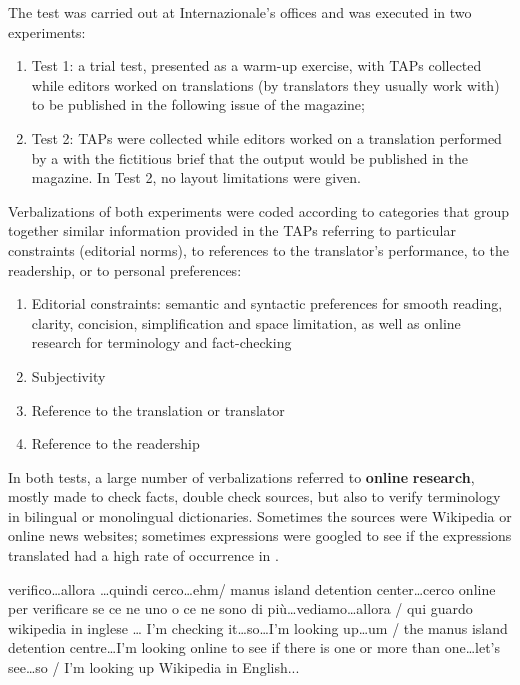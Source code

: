 \documentclass[output=paper]{LSP/langsci}
\begin{document}
The test was carried out at Internazionale's offices and was executed in two experiments: 


\begin{enumerate}
 \renewcommand{\labelenumi}{}
 \item Test 1: a trial test, presented as a warm-up exercise, with TAPs collected while editors worked on translations (by translators they usually work with) to be published in the following issue of the magazine;
 \item Test 2: TAPs were collected while editors worked on a translation performed by a  with the fictitious brief that the output would be published in the magazine. In Test 2, no layout limitations were given. 
\end{enumerate}

Verbalizations of both experiments were coded according to categories that group together similar information provided in the TAPs referring to particular constraints (editorial norms), to references to the translator's performance, to the readership, or to personal preferences: 

\begin{enumerate}
\renewcommand{\labelenumi}{\roman{enumi}.}%
 \item Editorial constraints: semantic and syntactic preferences for smooth reading, clarity, concision, simplification and space limitation, as well as online research for terminology and fact-checking
 \item Subjectivity
 \item Reference to the translation or translator
 \item Reference to the readership 
\end{enumerate}

In both tests, a large number of verbalizations referred to \textbf{online} \textbf{research}, mostly made to check facts, double check sources, but also to verify terminology in bilingual or monolingual dictionaries. Sometimes the sources were Wikipedia or online news websites; sometimes expressions were googled to see if the expressions translated had a high rate of occurrence in . 

\ea \label{troqe-marchan:ex:1}%
\glt verifico\ldots allora \ldots  quindi cerco\ldots  ehm/ manus island detention center\ldots cerco online per verificare se ce ne uno o ce ne sono di più\ldots vediamo\ldots  allora / qui guardo wikipedia in inglese \ldots
\glt I'm checking it\ldots so\ldots I'm looking up\ldots  um / the manus island detention centre\ldots I'm looking online to see if there is one or more than one\ldots  let's see\ldots so / I'm looking up Wikipedia in English...\footnotemark
\z%
\end{document}
